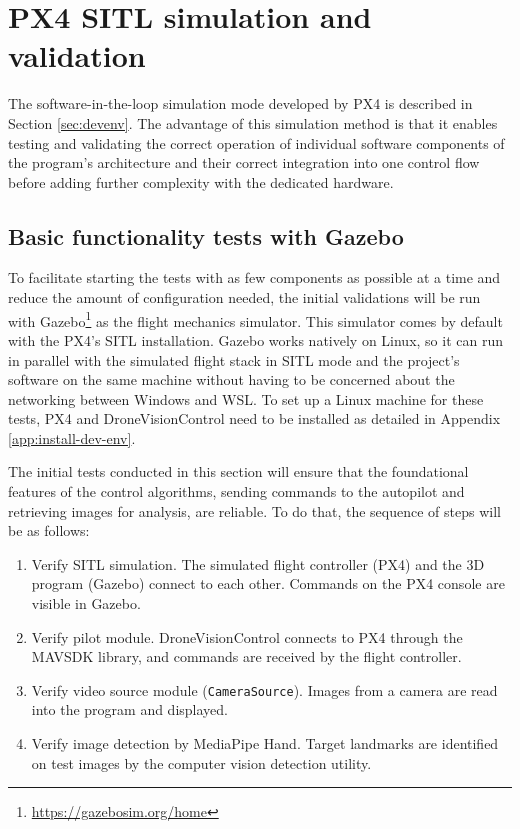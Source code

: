 \section{PX4 SITL simulation and validation}
\label{sec:test-2-sitl}

The software-in-the-loop simulation mode developed by PX4 is described in Section \ref{sec:devenv}. The advantage of this simulation method is that it enables testing and validating the correct operation of individual software components of the program's architecture and their correct integration into one control flow before adding further complexity with the dedicated hardware.

\subsection{Basic functionality tests with Gazebo}

To facilitate starting the tests with as few components as possible at a time and reduce the amount of configuration needed, the initial validations will be run with Gazebo\footnote{\url{https://gazebosim.org/home}} as the flight mechanics simulator. This simulator comes by default with the PX4's SITL installation. Gazebo works natively on Linux, so it can run in parallel with the simulated flight stack in SITL mode and the project's software on the same machine without having to be concerned about the networking between Windows and WSL. To set up a Linux machine for these tests, PX4 and DroneVisionControl need to be installed as detailed in Appendix \ref{app:install-dev-env}.

The initial tests conducted in this section will ensure that the foundational features of the control algorithms, sending commands to the autopilot and retrieving images for analysis, are reliable.
To do that, the sequence of steps will be as follows:
\begin{enumerate}
    \item Verify SITL simulation. The simulated flight controller (PX4) and the 3D program (Gazebo) connect to each other. Commands on the PX4 console are visible in Gazebo.
    \item Verify pilot module. DroneVisionControl connects to PX4 through the MAVSDK library, and commands are received by the flight controller.
    \item Verify video source module (\texttt{CameraSource}). Images from a camera are read into the program and displayed.
    \item Verify image detection by MediaPipe Hand. Target landmarks are identified on test images by the computer vision detection utility.
\end{enumerate}

